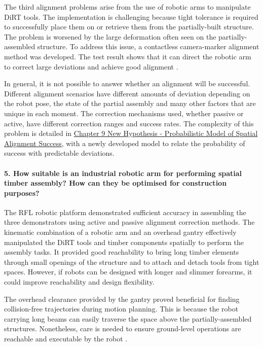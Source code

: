 The third alignment problems arise from the use of robotic arms to manipulate DiRT tools. The implementation is challenging because tight tolerance is required to successfully place them on or retrieve them from the partially-built structure. The problem is worsened by the large deformation often seen on the partially-assembled structure. To address this issue, a contactless camera-marker alignment method was developed. The test result shows that it can direct the robotic arm to correct large deviations and achieve good alignment .

In general, it is not possible to answer whether an alignment will be successful. Different alignment scenarios have different amounts of deviation depending on the robot pose, the state of the partial assembly and many other factors that are unique in each moment. The correction mechanisms used, whether passive or active, have different correction ranges and success rates. The complexity of this problem is detailed in \ul{Chapter 9 New Hypothesis - Probabilistic Model of Spatial Alignment Success}, with a newly developed model to relate the probability of success with predictable deviations.

\paragraph{5. How suitable is an industrial robotic arm for performing spatial timber assembly? How can they be optimised for construction purposes?}

The RFL robotic platform demonstrated sufficient accuracy in assembling the three demonstrators using active and passive alignment correction methods. The kinematic combination of a robotic arm and an overhead gantry effectively manipulated the DiRT tools and timber components spatially to perform the assembly tasks. It provided good reachability to bring long timber elements through small openings of the structure and to attach and detach tools from tight spaces. However, if robots can be designed with longer and slimmer forearms, it could improve reachability and design flexibility. 

The overhead clearance provided by the gantry proved beneficial for finding collision-free trajectories during motion planning. This is because the robot carrying long beams can easily traverse the space above the partially-assembled structures. Nonetheless, care is needed to ensure ground-level operations are reachable and executable by the robot .

